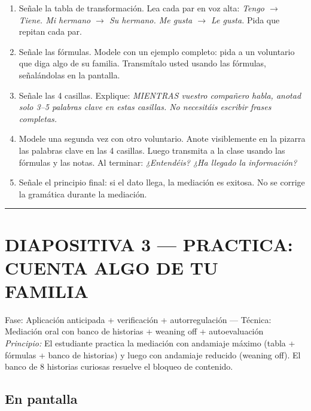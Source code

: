 \documentclass[a4paper,11pt]{article}
\begin{document}
\begin{enumerate}[leftmargin=1.5cm, itemsep=4pt]
\item Señale la tabla de transformación. Lea cada par en voz alta: \textit{Tengo $\rightarrow$ Tiene. Mi hermano $\rightarrow$ Su hermano. Me gusta $\rightarrow$ Le gusta.} Pida que repitan cada par.
\item Señale las fórmulas. Modele con un ejemplo completo: pida a un voluntario que diga algo de su familia. Transmítalo usted usando las fórmulas, señalándolas en la pantalla.
\item Señale las 4 casillas. Explique: \textit{MIENTRAS vuestro compañero habla, anotad solo 3--5 palabras clave en estas casillas. No necesitáis escribir frases completas.}
\item Modele una segunda vez con otro voluntario. Anote visiblemente en la pizarra las palabras clave en las 4 casillas. Luego transmita a la clase usando las fórmulas y las notas. Al terminar: \textit{¿Entendéis? ¿Ha llegado la información?}
\item Señale el principio final: si el dato llega, la mediación es exitosa. No se corrige la gramática durante la mediación.
\end{enumerate}

\newpage


\noindent\textcolor{violeta}{\rule{\linewidth}{2.5pt}}

\section*{DIAPOSITIVA 3 — PRACTICA: CUENTA ALGO DE TU FAMILIA}

{\small Fase: Aplicación anticipada + verificación + autorregulación — Técnica: Mediación oral con banco de historias + weaning off + autoevaluación}\\
{\small\textit{Principio:} El estudiante practica la mediación con andamiaje máximo (tabla + fórmulas + banco de historias) y luego con andamiaje reducido (weaning off). El banco de 8 historias curiosas resuelve el bloqueo de contenido.}

\vspace{0.5cm}

\subsection*{En pantalla}
\end{document}
